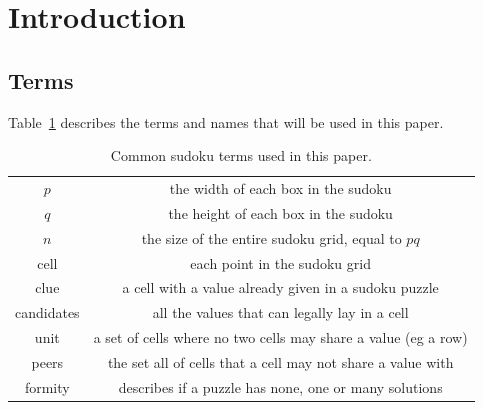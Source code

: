 
\section{Introduction}

\subsection{Terms}
Table~\ref{tab:terms} describes the terms and names that will be used in this paper.
\begin{table}[H]
\begin{center}\begin{tabular}{c||c}
    \hline
    $p$         &   the width of each box in the sudoku                             \\
    $q$         &   the height of each box in the sudoku                            \\
    $n$         &   the size of the entire sudoku grid, equal to $pq$               \\
    cell        &   each point in the sudoku grid                                   \\
    clue        &   a cell with a value already given in a sudoku puzzle            \\
    candidates  &   all the values that can legally lay in a cell                   \\
    unit        &   a set of cells where no two cells may share a value (eg a row)  \\
    peers       &   the set all of cells that a cell may not share a value with     \\
    formity     &   describes if a puzzle has none, one or many solutions           \\
    \hline
\end{tabular}\end{center}
\caption{Common sudoku terms used in this paper.}
\label{tab:terms}
\end{table}

